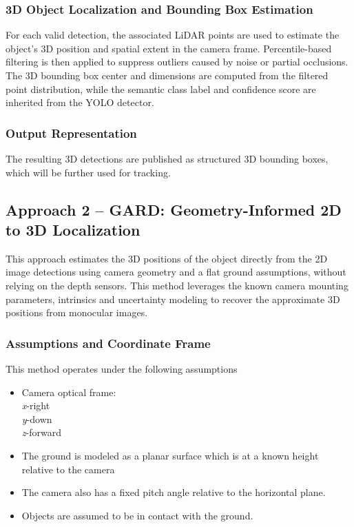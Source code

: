\documentclass[12pt,a4paper]{report}
\begin{document}
\subsubsection{3D Object Localization and Bounding Box Estimation}
For each valid detection, the associated LiDAR points are used to estimate the object's 3D position and spatial extent in the camera frame. Percentile-based filtering is then applied to suppress outliers caused by noise or partial occlusions. The 3D bounding box center and dimensions are computed from the filtered point distribution, while the semantic class label and confidence score are inherited from the YOLO detector.
\subsubsection{Output Representation}
The resulting 3D detections are published as structured 3D bounding boxes, which will be further used for tracking.

\subsection{Approach 2 -- GARD: Geometry-Informed 2D to 3D Localization}
This approach estimates the 3D positions of the object directly from the 2D image detections using camera geometry and a flat ground assumptions, without relying on the depth sensors. This method leverages the known camera mounting parameters, intrinsics and uncertainty modeling to recover the approximate 3D positions from monocular images.

\subsubsection{Assumptions and Coordinate Frame}
This method operates under the following assumptions
\begin{itemize}
    \item Camera optical frame: \\\textit{x}-right\\\textit{y}-down\\\textit{z}-forward
\end{itemize}
\begin{itemize}
    \item The ground is modeled as a planar surface which is at a known height relative to the camera
    \item The camera also has a fixed pitch angle relative to the horizontal plane.
    \item Objects are assumed to be in contact with the ground.
\end{itemize}
\end{document}
